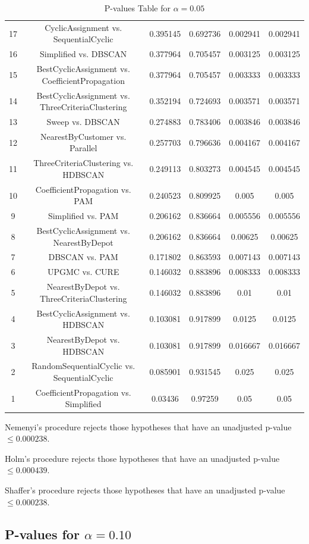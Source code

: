 \documentclass[a4paper,10pt]{article}
\begin{document}
\begin{landscape}
\begin{table}[!htp]
\begin{tabular}{cccccc}
17&CyclicAssignment vs. SequentialCyclic&0.395145&0.692736&0.002941&0.002941\\
16&Simplified vs. DBSCAN&0.377964&0.705457&0.003125&0.003125\\
15&BestCyclicAssignment vs. CoefficientPropagation&0.377964&0.705457&0.003333&0.003333\\
14&BestCyclicAssignment vs. ThreeCriteriaClustering&0.352194&0.724693&0.003571&0.003571\\
13&Sweep vs. DBSCAN&0.274883&0.783406&0.003846&0.003846\\
12&NearestByCustomer vs. Parallel&0.257703&0.796636&0.004167&0.004167\\
11&ThreeCriteriaClustering vs. HDBSCAN&0.249113&0.803273&0.004545&0.004545\\
10&CoefficientPropagation vs. PAM&0.240523&0.809925&0.005&0.005\\
9&Simplified vs. PAM&0.206162&0.836664&0.005556&0.005556\\
8&BestCyclicAssignment vs. NearestByDepot&0.206162&0.836664&0.00625&0.00625\\
7&DBSCAN vs. PAM&0.171802&0.863593&0.007143&0.007143\\
6&UPGMC vs. CURE&0.146032&0.883896&0.008333&0.008333\\
5&NearestByDepot vs. ThreeCriteriaClustering&0.146032&0.883896&0.01&0.01\\
4&BestCyclicAssignment vs. HDBSCAN&0.103081&0.917899&0.0125&0.0125\\
3&NearestByDepot vs. HDBSCAN&0.103081&0.917899&0.016667&0.016667\\
2&RandomSequentialCyclic vs. SequentialCyclic&0.085901&0.931545&0.025&0.025\\
1&CoefficientPropagation vs. Simplified&0.03436&0.97259&0.05&0.05\\
\hline
\end{tabular}
\caption{P-values Table for $\alpha=0.05$}
\end{table}Nemenyi's procedure rejects those hypotheses that have an unadjusted p-value $\le0.000238$.

Holm's procedure rejects those hypotheses that have an unadjusted p-value $\le0.000439$.

Shaffer's procedure rejects those hypotheses that have an unadjusted p-value $\le0.000238$.

\pagebreak

\subsection{P-values for $\alpha=0.10$}


\end{landscape}
\end{document}
